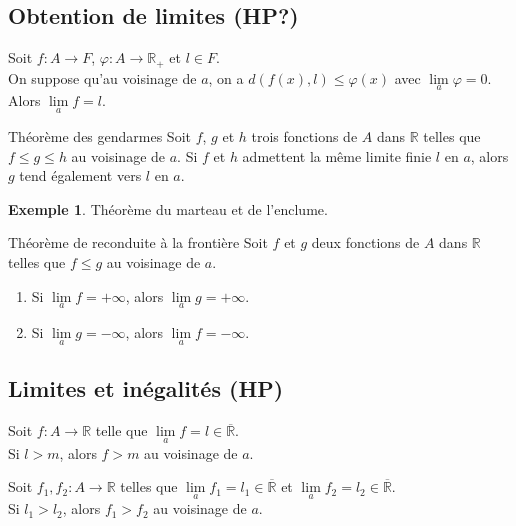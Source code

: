 \documentclass[french]{article}
\newcommand{\R}{\mathbb{R}}
\theoremstyle{plain}
\theoremstyle{definition}
\newtheorem*{ex}{Exemple}
\theoremstyle{remark}
\begin{document}
\subsection{Obtention de limites (HP?)}

\begin{thm}{}%
	Soit $f:A\to F$, $\varphi:A\to\R_+$ et $l\in F$. \\
	On suppose qu'au voisinage de $a$, on a $d(f(x),l)\leqslant\varphi(x)$ avec $\underset{a}{\lim}\varphi=0$. \\
	Alors $\underset{a}{\lim}f=l$.
\end{thm}

\begin{thm}{Théorème des gendarmes}%
	Soit $f$, $g$ et $h$ trois fonctions de $A$ dans $\R$ telles que $f\leqslant g\leqslant h$ au voisinage de $a$. Si $f$ et $h$ admettent la même limite finie $l$ en $a$, alors $g$ tend également vers $l$ en $a$.
\end{thm}

\begin{ex}
	Théorème du marteau et de l'enclume. %
\end{ex}

\begin{thm}{Théorème de reconduite à la frontière}%
	Soit $f$ et $g$ deux fonctions de $A$ dans $\R$ telles que $f\leqslant g$ au voisinage de $a$.
	\begin{enumerate}
		\item Si $\underset{a}{\lim}f=+\infty$, alors $\underset{a}{\lim}g=+\infty$.
		\item Si $\underset{a}{\lim}g=-\infty$, alors $\underset{a}{\lim}f=-\infty$.
	\end{enumerate}
\end{thm}

\subsection{Limites et inégalités (HP)}

\begin{thm}{}%
	Soit $f:A\to\R$ telle que $\underset{a}{\lim}f=l\in\overline{\R}$.\\
	Si $l>m$, alors $f>m$ au voisinage de $a$.
\end{thm}

\begin{thm}{}%
	Soit $f_1,f_2:A\to\R$ telles que $\underset{a}{\lim}f_1=l_1\in\overline{\R}$ et $\underset{a}{\lim}f_2=l_2\in\overline{\R}$.\\
	Si $l_1>l_2$, alors $f_1>f_2$ au voisinage de $a$.
\end{thm}
\end{document}

